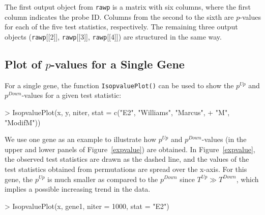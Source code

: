 \documentclass[10pt]{article}
\begin{document}
The first output object from \texttt{rawp} is a matrix with six
columns, where the first column indicates the probe ID. Columns from
the second to the sixth are $p$-values for each of the five test
statistics, respectively. The remaining three output objects
(\texttt{rawp}[[2]], \texttt{rawp}[[3]], \texttt{rawp}[[4]]) are
structured in the same way.


\subsection{Plot of $p$-values for a Single Gene}

For a single gene, the function \texttt{IsopvaluePlot()} can be used
to show the $p^{Up}$ and $p^{Down}$-values for a given test
statistic:

\begin{Schunk}
\begin{Sinput}
> IsopvaluePlot(x, y, niter, stat = c("E2", "Williams", "Marcus", 
+     "M", "ModifM"))
\end{Sinput}
\end{Schunk}


We use one gene as an example to illustrate how $p^{Up}$ and
$p^{Down}$-values (in the upper and lower panels of
Figure~\ref{expvalue}) are obtained. In Figure~\ref{expvalue}, the
observed test statistics are drawn as the dashed line, and the
values of the test statistics obtained from permutations are spread
over the x-axis. For this gene, the $p^{Up}$ is much smaller as
compared to the $p^{Down}$ since $T^{Up} \gg T^{Down}$, which
implies a possible increasing trend in the data.

\begin{Schunk}
\begin{Sinput}
> IsopvaluePlot(x, gene1, niter = 1000, stat = "E2")
\end{Sinput}
\end{Schunk}
\end{document}
